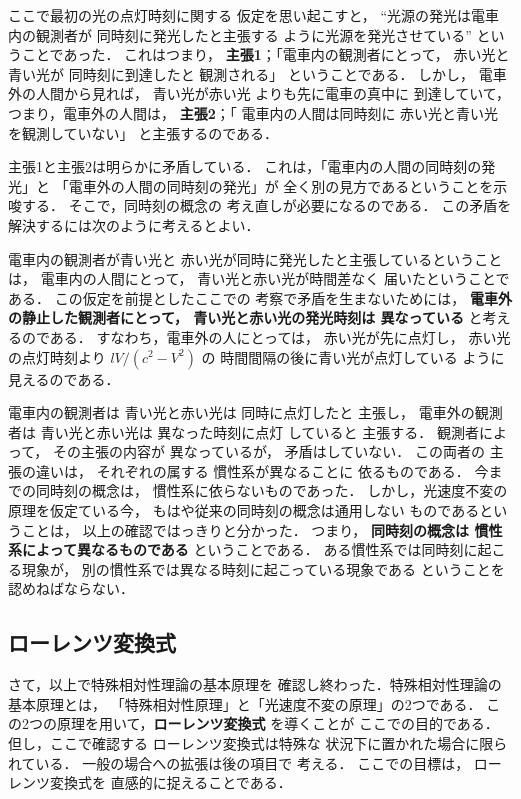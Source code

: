 ここで最初の光の点灯時刻に関する
仮定を思い起こすと，
“光源の発光は電車内の観測者が
同時刻に発光したと主張する
ように光源を発光させている”
ということであった．
これはつまり，
\newline \newline
\textbf{主張1}；「電車内の観測者にとって，
赤い光と青い光が
同時刻に到達したと
観測される」
\newline \newline
ということである．
しかし，
電車外の人間から見れば，
青い光が赤い光
よりも先に電車の真中に
到達していて，
つまり，電車外の人間は，
\newline \newline
\textbf{主張2}；「
電車内の人間は同時刻に
赤い光と青い光を観測していない」
\newline \newline
と主張するのである．

主張1と主張2は明らかに矛盾している．
これは，「電車内の人間の同時刻の発光」と
「電車外の人間の同時刻の発光」が
全く別の見方であるということを示唆する．
そこで，同時刻の概念の
考え直しが必要になるのである．
この矛盾を解決するには次のように考えるとよい．

電車内の観測者が青い光と
赤い光が同時に発光したと主張しているということは，
電車内の人間にとって，
青い光と赤い光が時間差なく
届いたということである．
この仮定を前提としたここでの
考察で矛盾を生まないためには，
\textbf{電車外の静止した観測者にとって，
青い光と赤い光の発光時刻は
異なっている} と考えるのである．
すなわち，電車外の人にとっては，
赤い光が先に点灯し，
赤い光の点灯時刻より $lV/({c^{2}-V^{2}})$ の
時間間隔の後に青い光が点灯している
ように見えるのである．

電車内の観測者は
青い光と赤い光は
同時に点灯したと
主張し，
電車外の観測者は
青い光と赤い光は
異なった時刻に点灯
していると
主張する．
観測者によって，
その主張の内容が
異なっているが，
矛盾はしていない．
この両者の
主張の違いは，
それぞれの属する
慣性系が異なることに
依るものである．
今までの同時刻の概念は，
慣性系に依らないものであった．
しかし，光速度不変の原理を仮定ている今，
もはや従来の同時刻の概念は通用しない
ものであるということは，
以上の確認ではっきりと分かった．
つまり，\textbf{
同時刻の概念は
慣性系によって異なるものである} ということである．
ある慣性系では同時刻に起こる現象が，
別の慣性系では異なる時刻に起こっている現象である
ということを認めねばならない．






\subsection{ローレンツ変換式}
\begin{mycomment}
さて，以上で特殊相対性理論の基本原理を
確認し終わった．特殊相対性理論の基本原理とは，
「特殊相対性原理」と「光速度不変の原理」の2つである．
この2つの原理を用いて，\textbf{ローレンツ変換式} を導くことが
ここでの目的である．但し，ここで確認する
ローレンツ変換式は特殊な
状況下に置かれた場合に限られている．
一般の場合への拡張は後の項目で
考える．
ここでの目標は，
ローレンツ変換式を
直感的に捉えることである．
\end{mycomment}



